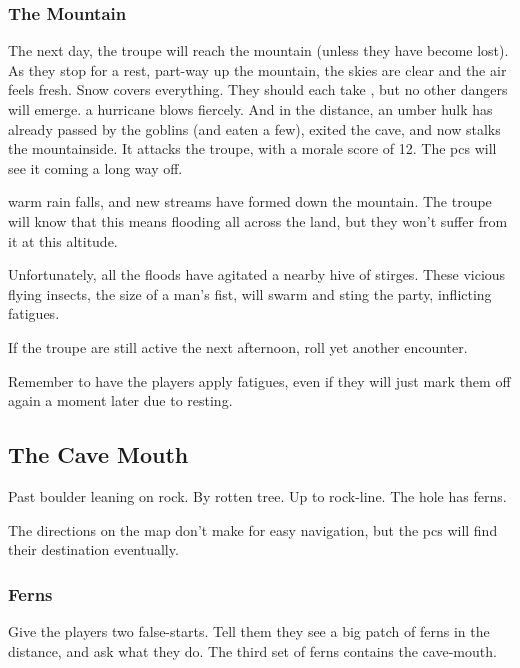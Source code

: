 \begin{multicols}{2}
\subsubsection{The Mountain}
The next day, the troupe will reach the mountain (unless they have become lost).
As they stop for a rest, part-way up the mountain,
\ifcase\value{temperature}
  the skies are clear and the air feels fresh.
  Snow covers everything.
  They should each take , but no other dangers will emerge.
  \or
  a hurricane blows fiercely.
  And in the distance, an umber hulk has already passed by the goblins (and eaten a few), exited the cave, and now stalks the mountainside.
  It attacks the troupe, with a morale score of 12.
  The \glspl{pc} will see it coming a long way off.

  \umberhulk
  \else
  warm rain falls, and new streams have formed down the mountain.
  The troupe will know that this means flooding all across the land, but they won't suffer from it at this altitude.

  Unfortunately, all the floods have agitated a nearby hive of stirges.
  These vicious flying insects, the size of a man's fist, will swarm%
  and sting the party, inflicting \glspl{fatigue}.%

  \stirgeSwarm
\fi

If the troupe are still active the next afternoon, roll yet another encounter.%

Remember to have the players apply \glspl{fatigue}, even if they will just mark them off again a moment later due to resting.

\subsection{The Cave Mouth}

\begin{exampletext}
  Past boulder leaning on rock.
  By rotten tree.
  Up to rock-line.
  The hole has ferns.
\end{exampletext}

The directions on the map don't make for easy navigation, but the \glspl{pc} will find their destination eventually.

\subsubsection{Ferns}
Give the players two false-starts.
Tell them they see a big patch of ferns in the distance, and ask what they do.
The third set of ferns contains the cave-mouth.


\end{multicols}
